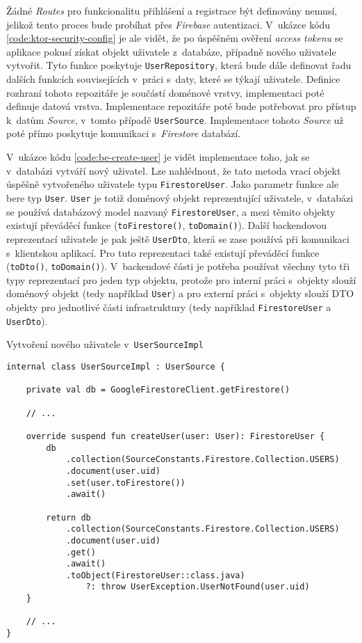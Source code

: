 Žádné \emph{Routes} pro funkcionalitu přihlášení a registrace být definovány nemusí, jelikož tento proces bude probíhat přes \emph{Firebase} autentizaci. V~ukázce kódu \ref{code:ktor-security-config} je ale vidět, že po úspěšném ověření \emph{access tokenu} se aplikace pokusí získat objekt uživatele z~databáze, případně nového uživatele vytvořit. Tyto funkce poskytuje \texttt{UserRepository}, která bude dále definovat řadu dalších funkcích souvisejících v~práci s~daty, které se týkají uživatele. Definice rozhraní tohoto repozitáře je součástí doménové vrstvy, implementaci poté definuje datová vrstva. Implementace repozitáře poté bude potřebovat pro přístup k~datům \emph{Source}, v~tomto případě \texttt{UserSource}. Implementace tohoto \emph{Source} už poté přímo poskytuje komunikaci s~\emph{Firestore} databází.

V~ukázce kódu \ref{code:be-create-user} je vidět implementace toho, jak se v~databázi vytváří nový uživatel. Lze nahlédnout, že tato metoda vrací objekt úspěšně vytvořeného uživatele typu \texttt{FirestoreUser}. Jako parametr funkce ale bere typ \texttt{User}. \texttt{User} je totiž doménový objekt reprezentující uživatele, v~databázi se používá databázový model nazvaný \texttt{FirestoreUser}, a mezi těmito objekty existují převáděcí funkce (\texttt{toFirestore()}, \texttt{toDomain()}). Další backendovou reprezentací uživatele je pak ještě \texttt{UserDto}, která se zase používá při komunikaci s~klientskou aplikací. Pro tuto reprezentaci také existují převáděcí funkce (\texttt{toDto()}, \texttt{toDomain()}). V~backendové části je potřeba používat všechny tyto tři typy reprezentací pro jeden typ objektu, protože pro interní práci s~objekty slouží doménový objekt (tedy například \texttt{User}) a pro externí práci s~objekty slouží DTO objekty pro jednotlivé části infrastruktury (tedy například \texttt{FirestoreUser} a \texttt{UserDto}).

\begin{listing}
\caption{Vytvoření nového uživatele v~\texttt{UserSourceImpl}}\label{code:be-create-user}
\begin{verbatim}
internal class UserSourceImpl : UserSource {

    private val db = GoogleFirestoreClient.getFirestore()
    
    // ...
    
    override suspend fun createUser(user: User): FirestoreUser {
        db
            .collection(SourceConstants.Firestore.Collection.USERS)
            .document(user.uid)
            .set(user.toFirestore())
            .await()

        return db
            .collection(SourceConstants.Firestore.Collection.USERS)
            .document(user.uid)
            .get()
            .await()
            .toObject(FirestoreUser::class.java) 
                ?: throw UserException.UserNotFound(user.uid)
    }
    
    // ...
}
\end{verbatim}
\end{listing}

